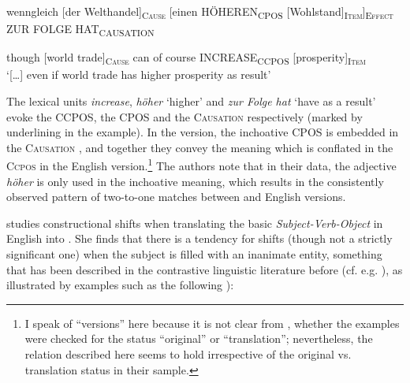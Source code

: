 \documentclass[output=paper]{LSP/langsci}
\begin{document}
\ea\label{czulo:ex:6}
wenngleich [der Welthandel]\textsc{\textsubscript{Cause}} [einen HÖHEREN\textsubscript{CPOS} [Wohlstand]\textsc{\textsubscript{Item}}]\textsc{\textsubscript{Effect}} ZUR FOLGE HAT\textsubscript{CAUSATION}\\
\medskip

though [world trade]\textsc{\textsubscript{Cause}} can of course INCREASE\textsubscript{CCPOS} [prosperity]\textsc{\textsubscript{Item}}\textsc{\textsubscript{} } \\
\glt `[\ldots ] even if world trade has higher prosperity as result'
\z

The lexical units \textit{increase}, \textit{höher} `higher' and \textit{zur Folge hat} `have as a result' evoke the \textsc{CCPOS}, the \textsc{CPOS} and the \textsc{Causation}  respectively (marked by underlining in the example). In the  version, the inchoative \textsc{CPOS}  is embedded in the \textsc{Causation} , and together they convey the meaning which is conflated in the \textsc{Ccpos}  in the English version.\footnote{I speak of ``versions'' here because it is not clear from \citet{Pado2005}, whether the examples were checked for the status ``original'' or ``translation''; nevertheless, the relation described here seems to hold irrespective of the original vs. translation status in their sample.} The authors note that in their data, the adjective \textit{höher} is only used in the inchoative meaning, which results in the consistently observed  pattern of two-to-one  matches between  and English versions.

\citet{Serbina2013} studies constructional shifts when translating the basic \textit{Subject-Verb-Object}  in English into . She finds that there is a tendency for shifts (though not a strictly significant one) when the subject is filled with an inanimate entity, something that has been described in the contrastive linguistic literature before (cf. e.g. \citealt{Hawkins1986, Konig2009}), as illustrated by examples such as the following \citealt[108]{Konig2009}):
\end{document}
